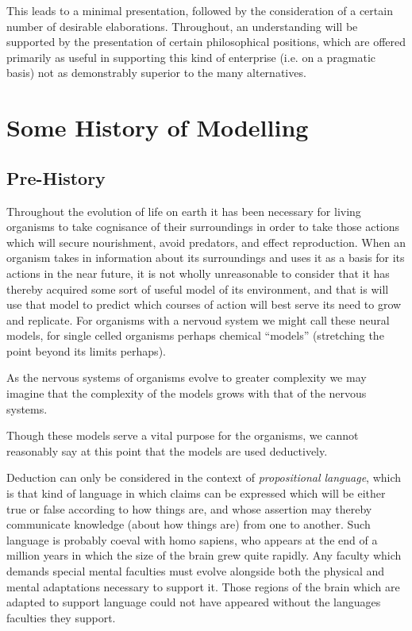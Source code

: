 \documentclass[10pt,titlepage]{book}
\begin{document}
This leads to a minimal presentation, followed by the consideration of a certain number of desirable elaborations.
Throughout, an understanding will be supported by the presentation of certain philosophical positions, which are offered primarily as useful in supporting this kind of enterprise (i.e. on a pragmatic basis) not as demonstrably superior to the many alternatives.

\section{Some History of Modelling}

\subsection{Pre-History}

Throughout the evolution of life on earth it has been necessary for living organisms to take cognisance of their surroundings in order to take those actions which will secure nourishment, avoid predators, and effect reproduction.
When an organism takes in information about its surroundings and uses it as a basis for its actions in the near future, it is not wholly unreasonable to consider that it has thereby acquired some sort of useful model of its environment, and that is will use that model to predict which courses of action will best serve its need to grow and replicate.
For organisms with a nervoud system we might call these neural models, for single celled organisms perhaps chemical ``models'' (stretching the point beyond its limits perhaps).

As the nervous systems of organisms evolve to greater complexity we may imagine that the complexity of the models grows with that of the nervous systems.

Though these models serve a vital purpose for the organisms, we cannot reasonably say at this point that the models are used deductively.

Deduction can only be considered in the context of \emph{propositional language}, which is that kind of language in which claims can be expressed which will be either true or false according to how things are, and whose assertion may thereby communicate knowledge (about how things are) from one to another.
Such language is probably coeval with homo sapiens, who appears at the end of a million years in which the size of the brain grew quite rapidly.
Any faculty which demands special mental faculties must evolve alongside both the physical and mental adaptations necessary to support it.
Those regions of the brain which are adapted to support language could not have appeared without the languages faculties they support.
\end{document}
